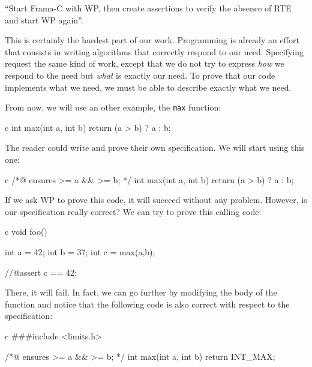 \documentclass[middle]{zmdocument}
\begin{document}
``Start Frama-C with WP, then create assertions to verify the absence of
RTE and start WP again''.







This is certainly the hardest part of our work. Programming is already
an effort that consists in writing algorithms that correctly respond to
our need. Specifying request the same kind of work, except that we do
not try to express \emph{how} we respond to the need but \emph{what} is
exactly our need. To prove that our code implements what we need, we
must be able to describe exactly what we need.

From now, we will use an other example, the \texttt{max} function:



\begin{CodeBlock}{c}
int max(int a, int b){
  return (a > b) ? a : b;
}
\end{CodeBlock}



The reader could write and prove their own specification. We will start
using this one:



\begin{CodeBlock}{c}
/*@
  ensures \result >= a && \result >= b;
*/
int max(int a, int b){
  return (a > b) ? a : b;
}
\end{CodeBlock}



If we ask WP to prove this code, it will succeed without any problem.
However, is our specification really correct? We can try to prove this
calling code:



\begin{CodeBlock}{c}
void foo(){
  int a = 42;
  int b = 37;
  int c = max(a,b);

  //@assert c == 42;
}
\end{CodeBlock}



There, it will fail. In fact, we can go further by modifying the body of
the  function and notice that the following code is also
correct with respect to the specification:



\begin{CodeBlock}{c}
###include <limits.h>

/*@
  ensures \result >= a && \result >= b;
*/
int max(int a, int b){
  return INT_MAX;
}
\end{CodeBlock}
\end{document}
